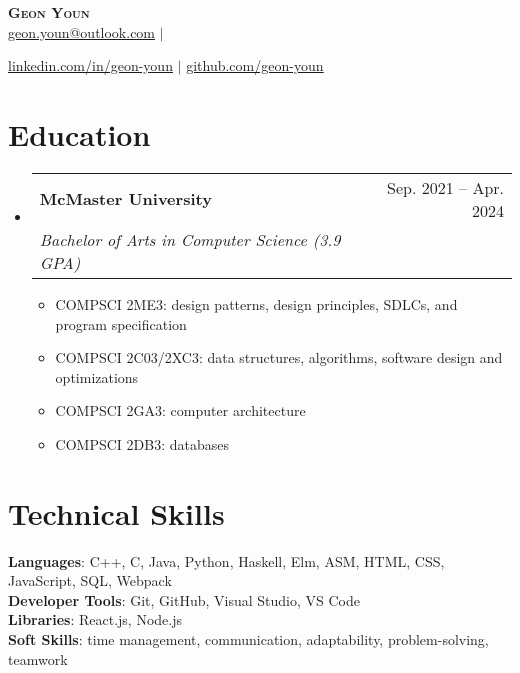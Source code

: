 \documentclass[letterpaper,11pt]{article}
\makeatletter
\newcommand{\resumeItem}[1]{
	\item\small{
		{#1 \vspace{-2pt}}
	}
}
\newcommand{\resumeSubheading}[4]{
	\vspace{-2pt}\item
	\begin{tabular*}{0.97\textwidth}[t]{l@{\extracolsep{\fill}}r}
		\textbf{#1} & #2 \\
		\textit{\small#3} & \textit{\small #4} \\
	\end{tabular*}\vspace{-7pt}
}
\newcommand{\resumeSubHeadingListStart}{\begin{itemize}[leftmargin=0.15in,
			label={}]}
\newcommand{\resumeSubHeadingListEnd}{\end{itemize}}
\newcommand{\resumeItemListStart}{\begin{itemize}}
\newcommand{\resumeItemListEnd}{\end{itemize}\vspace{-5pt}}
\makeatother
\begin{document}
\begin{center}
	\textbf{\Huge \scshape Geon Youn} \\ \vspace{1pt}
	\small
	\href{mailto:geon.youn@outlook.com}{\underline{geon.youn@outlook.com}}
	$|$

	\href{https://linkedin.com/in/geon-youn}{\underline{linkedin.com/in/geon-youn}}
	$|$
	\href{https://github.com/geon-youn}{\underline{github.com/geon-youn}}
\end{center}

\section{Education}
\resumeSubHeadingListStart
\resumeSubheading
{McMaster University}{Sep. 2021 -- Apr. 2024}
{Bachelor of Arts in Computer Science (3.9 GPA)}{}
\resumeItemListStart
\resumeItem{COMPSCI 2ME3: design patterns, design principles,
	SDLCs, and program specification}
\resumeItem{COMPSCI 2C03/2XC3: data structures, algorithms,
	software design and optimizations}
\resumeItem{COMPSCI 2GA3: computer architecture}
\resumeItem{COMPSCI 2DB3: databases}
\resumeItemListEnd
\resumeSubHeadingListEnd

\section{Technical Skills}
\begin{itemize}[leftmargin=0.15in, label={}]
	\small{\item{
		            \textbf{Languages}{: C++, C, Java, Python, Haskell,
			            Elm, ASM,
			            HTML, CSS, JavaScript, SQL, Webpack} \\
		            \textbf{Developer Tools}{: Git, GitHub, Visual
			            Studio, VS
			            Code} \\
		            \textbf{Libraries}{:
			            React.js,
			            Node.js} \\
		            \textbf{Soft Skills}{: time management,
			            communication, adaptability,
			            problem-solving, teamwork}
		      }}
\end{itemize}

%
\end{document}
